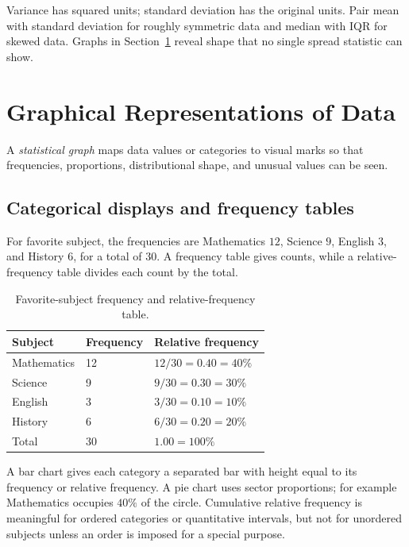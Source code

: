 \documentclass[11pt]{article}
\begin{document}
\begin{keybox}
Variance has squared units; standard deviation has the original units.  Pair
mean with standard deviation for roughly symmetric data and median with IQR
for skewed data.  Graphs in Section~\ref{sec:graphs} reveal shape that no
single spread statistic can show.
\end{keybox}

\section{Graphical Representations of Data}\label{sec:graphs}
A \emph{statistical graph} maps data values or categories to visual marks so
that frequencies, proportions, distributional shape, and unusual values can
be seen.

\subsection{Categorical displays and frequency tables}
For favorite subject, the frequencies are Mathematics $12$, Science $9$,
English $3$, and History $6$, for a total of $30$.  A frequency table gives
counts, while a relative-frequency table divides each count by the total.

\begin{table}[ht]
\centering
\caption{Favorite-subject frequency and relative-frequency table.}\label{tab:fav-subject}
\begin{tabularx}{0.75\textwidth}{@{}lYY@{}}
\toprule
Subject & Frequency & Relative frequency \\
\midrule
Mathematics & 12 & $12/30=0.40=40\%$ \\
Science & 9 & $9/30=0.30=30\%$ \\
English & 3 & $3/30=0.10=10\%$ \\
History & 6 & $6/30=0.20=20\%$ \\
\midrule
Total & 30 & $1.00=100\%$ \\
\bottomrule
\end{tabularx}
\end{table}

A bar chart gives each category a separated bar with height equal to its
frequency or relative frequency.  A pie chart uses sector proportions; for
example Mathematics occupies $40\%$ of the circle.  Cumulative relative
frequency is meaningful for ordered categories or quantitative intervals, but
not for unordered subjects unless an order is imposed for a special purpose.
\end{document}
